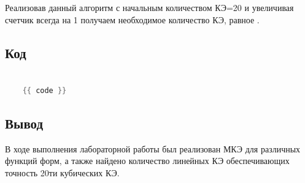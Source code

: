 Реализовав данный алгоритм с начальным количеством КЭ=20 и увеличивая счетчик всегда на 1 получаем необходимое количество КЭ, равное .

\subsection{Код}

\begin{lstlisting}[language=c++, label=prog,caption={\textit{Реализация МКЭ}}]

	{{ code }}

\end{lstlisting}
\subsection{Вывод}

В ходе выполнения лабораторной работы был реализован МКЭ для различных функций форм, а также найдено количество линейных КЭ обеспечивающих точность 20ти кубических КЭ.




